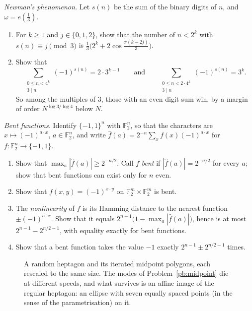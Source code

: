 \begin{exercise}[$\star\star$]\label{pb:newman}
\emph{Newman's phenomenon.} Let $s(n)$ be the sum of the binary digits of $n$, and $\omega=e(\frac13)$.
\begin{enumerate}[label=(\alph*)]
\item For $k\ge1$ and $j\in\{0,1,2\}$, show that the number of $n<2^k$ with $s(n)\equiv j\pmod3$ is $\frac13\bigl(2^k+2\cos\frac{\pi(k-2j)}3\bigr)$.
\item Show that
\[
\sum_{\substack{0\le n<4^k\\3\mid n}}(-1)^{s(n)}=2\cdot3^{k-1}\qquad\text{and}\qquad\sum_{\substack{0\le n<2\cdot4^k\\3\mid n}}(-1)^{s(n)}=3^k.
\]
So among the multiples of $3$, those with an even digit sum win, by a margin of order $N^{\log3/\log4}$ below $N$.
\end{enumerate}
\end{exercise}

\begin{exercise}[$\star\star$]\label{pb:bent}
\emph{Bent functions.} Identify $\{-1,1\}^n$ with $\mathbb F_2^n$, so that the characters are $x\mapsto(-1)^{a\cdot x}$, $a\in\mathbb F_2^n$, and write
$\hat f(a)=2^{-n}\sum_x f(x)(-1)^{a\cdot x}$ for $f:\mathbb F_2^n\to\{-1,1\}$.
\begin{enumerate}[label=(\alph*)]
\item Show that $\max_a|\hat f(a)|\ge2^{-n/2}$. Call $f$ \emph{bent} if $|\hat f(a)|=2^{-n/2}$ for every $a$; show that bent functions can
exist only for $n$ even.
\item Show that $f(x,y)=(-1)^{x\cdot y}$ on $\mathbb F_2^m\times\mathbb F_2^m$ is bent.
\item The \emph{nonlinearity} of $f$ is its Hamming distance to the nearest function $\pm(-1)^{a\cdot x}$. Show that it equals
$2^{n-1}\bigl(1-\max_a|\hat f(a)|\bigr)$, hence is at most $2^{n-1}-2^{n/2-1}$, with equality exactly for bent functions.
\item Show that a bent function takes the value $-1$ exactly $2^{n-1}\pm2^{n/2-1}$ times.
\end{enumerate}
\end{exercise}

\begin{figure}[ht]
\centering
{}
\caption{A random heptagon and its iterated midpoint polygons, each rescaled to the same size. The modes of
Problem~\ref{pb:midpoint} die at different speeds, and what survives is an affine image of the regular heptagon: an ellipse
with seven equally spaced points (in the sense of the parametrisation) on it.}
\label{fig:midpoint}
\end{figure}

